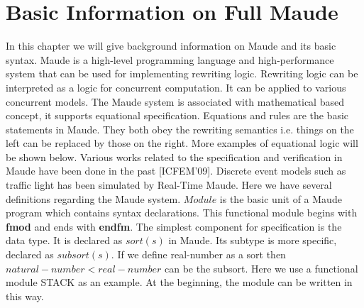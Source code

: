 \documentclass{report}
\begin{document}
\section{Basic Information on Full Maude}
In this chapter we will give background information on Maude and its basic syntax. Maude is a high-level programming language and high-performance system that can be used for implementing rewriting logic. Rewriting logic can be interpreted as a logic for concurrent computation. It can be applied to various concurrent models. The Maude system is associated with mathematical based concept, it supports equational specification. Equations and rules are the basic statements in Maude. They both obey the rewriting semantics i.e. things on the left can be replaced by those on the right. More examples of equational logic will be shown below. Various works related to the specification and verification in Maude have been done in the past [ICFEM'09]. Discrete event models such as traffic light has been simulated by Real-Time Maude.
\newline \newline
Here we have several definitions regarding the Maude system.
$Module$ is the basic unit of a Maude program which contains syntax declarations. This functional module begins with {\bf fmod} and ends with {\bf endfm}. The simplest component for specification is the data type. It is declared as $sort(s) $ in Maude. Its subtype is more specific, declared as $subsort(s) $. If we define real-number as a sort then $natural-number < real-number$ can be the subsort. Here we use a functional module STACK as an example. At the beginning, the module can be written in this way.
\end{document}
